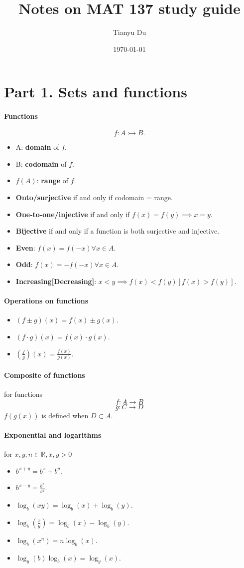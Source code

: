 \documentclass{article}
\author{Tianyu Du}
\date{\today}
\title{Notes on MAT 137 study guide}
\begin{document}
	\maketitle
	\tableofcontents
	\section{Part 1. Sets and functions}
	\paragraph{Functions}
	\[
	f: A \rightarrowtail B.
	\]
	\begin{itemize}
		\item A: \textbf{domain} of $f$.
		\item B: \textbf{codomain} of $f$.
		\item $f(A)$: \textbf{range} of $f$.
		\item \textbf{Onto/surjective} if and only if codomain = range.
		\item \textbf{One-to-one/injective} if and only if $f(x) = f(y) \implies x = y$.
		\item \textbf{Bijective} if and only if a function is both surjective and injective.
		\item \textbf{Even}: $f(x) = f(-x) \forall x \in A$.
		\item \textbf{Odd}: $f(x) = -f(-x) \forall x \in A$.
		\item \textbf{Increasing[Decreasing]}: $x < y \implies f(x) < f(y) [f(x) > f(y)]$.
	\end{itemize}
	\paragraph{Operations on functions}
	\begin{itemize}
		\item $(f \pm g)(x) = f(x) \pm g(x)$.
		\item $(f \cdot g)(x) = f(x) \cdot g(x)$.
		\item $(\frac{f}{g})(x) = \frac{f(x)}{g(x)}$.
	\end{itemize}
	\paragraph{Composite of functions} for functions 
	\[ f:A\rightarrow B
	\]\[
	g:C\rightarrow D
	\]
	$f(g(x))$ is defined when $D \subset A$.
	\paragraph{Exponential and logarithms} for $x,y,n \in \mathbb{R}, x,y > 0$
	\begin{itemize}
		\item $b^{x+y} = b^x + b^y$.
		\item $b^{x-y} = \frac{b^x}{b^y}$.
		\item $\log_b(xy) = \log_b(x) + \log_b(y)$.
		\item $\log_b(\frac{x}{y}) = \log_b(x) - \log_b(y)$.
		\item $\log_b(x^n) = n \log_b(x)$.
		\item $\log_y(b) \log_b(x) = \log_y(x)$.
	\end{itemize}
\end{document}
